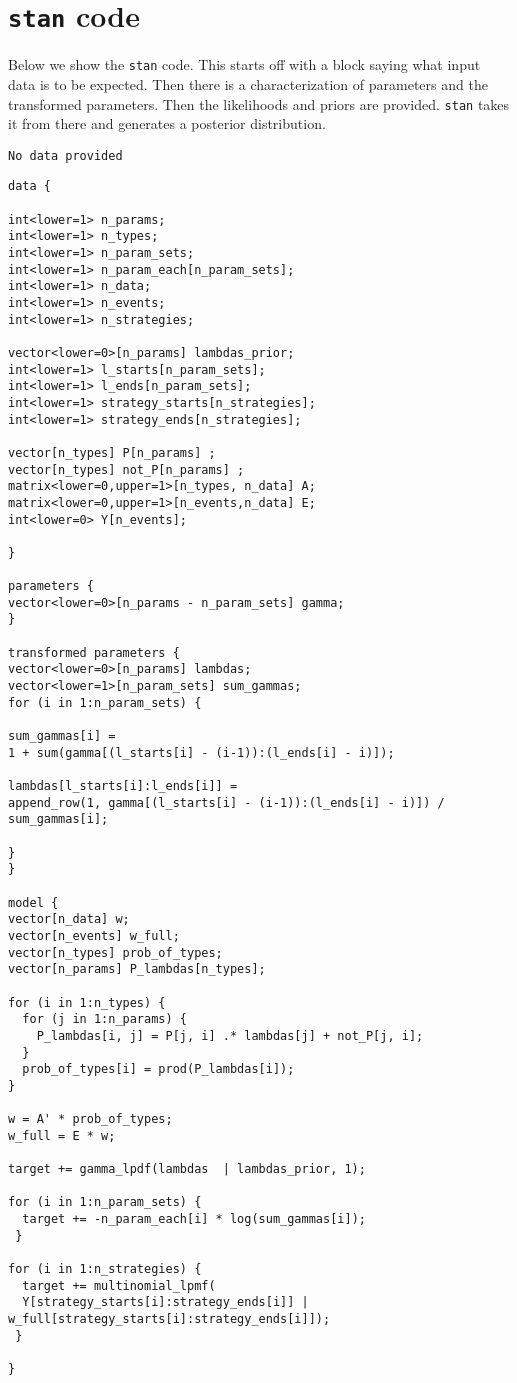 \documentclass[
  12pt,
]{book}
\begin{document}
\hypertarget{stan-code}{%
\section{\texorpdfstring{\texttt{stan} code}{stan code}}\label{stan-code}}

Below we show the \texttt{stan} code. This starts off with a block saying what input data is to be expected. Then there is a characterization of parameters and the transformed parameters. Then the likelihoods and priors are provided. \texttt{stan} takes it from there and generates a posterior distribution.

\begin{verbatim}
No data provided
\end{verbatim}

\begin{verbatim}
data {

int<lower=1> n_params;
int<lower=1> n_types;
int<lower=1> n_param_sets;
int<lower=1> n_param_each[n_param_sets];
int<lower=1> n_data;
int<lower=1> n_events;
int<lower=1> n_strategies;

vector<lower=0>[n_params] lambdas_prior;
int<lower=1> l_starts[n_param_sets];
int<lower=1> l_ends[n_param_sets];
int<lower=1> strategy_starts[n_strategies];
int<lower=1> strategy_ends[n_strategies];

vector[n_types] P[n_params] ;
vector[n_types] not_P[n_params] ;
matrix<lower=0,upper=1>[n_types, n_data] A;
matrix<lower=0,upper=1>[n_events,n_data] E;
int<lower=0> Y[n_events];

}

parameters {
vector<lower=0>[n_params - n_param_sets] gamma;
}

transformed parameters {
vector<lower=0>[n_params] lambdas;
vector<lower=1>[n_param_sets] sum_gammas;
for (i in 1:n_param_sets) {

sum_gammas[i] =
1 + sum(gamma[(l_starts[i] - (i-1)):(l_ends[i] - i)]);

lambdas[l_starts[i]:l_ends[i]] =
append_row(1, gamma[(l_starts[i] - (i-1)):(l_ends[i] - i)]) / sum_gammas[i];

}
}

model {
vector[n_data] w;
vector[n_events] w_full;
vector[n_types] prob_of_types;
vector[n_params] P_lambdas[n_types];

for (i in 1:n_types) {
  for (j in 1:n_params) {
    P_lambdas[i, j] = P[j, i] .* lambdas[j] + not_P[j, i];
  }
  prob_of_types[i] = prod(P_lambdas[i]);
}

w = A' * prob_of_types;
w_full = E * w;

target += gamma_lpdf(lambdas  | lambdas_prior, 1);

for (i in 1:n_param_sets) {
  target += -n_param_each[i] * log(sum_gammas[i]);
 }

for (i in 1:n_strategies) {
  target += multinomial_lpmf(
  Y[strategy_starts[i]:strategy_ends[i]] | w_full[strategy_starts[i]:strategy_ends[i]]);
 }

}
\end{verbatim}
\end{document}
